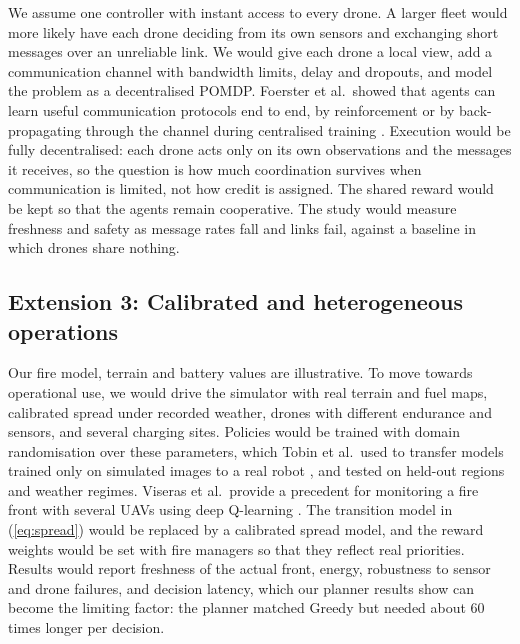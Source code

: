 We assume one controller with instant access to every drone. A larger fleet would more
likely have each drone deciding from its own sensors and exchanging short messages over an
unreliable link. We would give each drone a local view, add a communication channel with
bandwidth limits, delay and dropouts, and model the problem as a decentralised POMDP.
Foerster et al.\ showed that agents can learn useful communication protocols end to end, by
reinforcement or by back-propagating through the channel during centralised training
\cite{foerster2016}. Execution would be fully decentralised: each drone acts only on its own observations and
the messages it receives, so the question is how much coordination survives when
communication is limited, not how credit is assigned. The shared reward would be kept so that
the agents remain cooperative. The study would measure freshness and safety as message rates
fall and links fail, against a baseline in which drones share nothing.

\subsection{Extension 3: Calibrated and heterogeneous operations}

Our fire model, terrain and battery values are illustrative. To move towards operational
use, we would drive the simulator with real terrain and fuel maps, calibrated spread under
recorded weather, drones with different endurance and sensors, and several charging sites.
Policies would be trained with domain randomisation over these parameters, which Tobin et
al.\ used to transfer models trained only on simulated images to a real robot
\cite{tobin2017}, and tested on held-out regions and weather regimes. Viseras et al.\
provide a precedent for monitoring a fire front with several UAVs using deep Q-learning
\cite{viseras2021}. The transition model in (\ref{eq:spread}) would be replaced by a
calibrated spread model, and the reward weights would be set with fire managers so that they
reflect real priorities. Results would report freshness of the actual front, energy,
robustness to sensor and drone failures, and decision latency, which our planner results show
can become the limiting factor: the planner matched Greedy but needed about 60 times longer
per decision.

